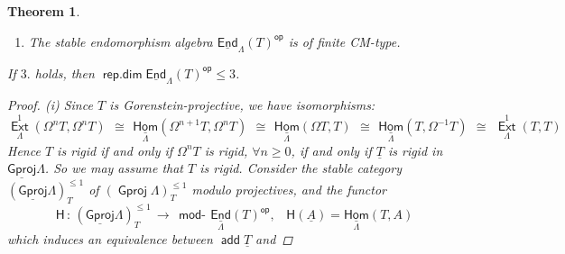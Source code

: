 \documentclass[oneside, a4paper,reqno]{amsart}
\numberwithin{equation}{section}
\newtheorem{thm}{Theorem}[section]
\theoremstyle{definition}
\begin{document}
\begin{thm}
\begin{enumerate}
\begin{enumerate}
\begin{enumerate}
\item[3.] The stable endomorphism algebra $\operatorname*{\underline{\mathsf{End}}}_{\Lambda}(T)^\operatorname*{\mathsf{op}}$ is of finite CM-type.
\end{enumerate}
If $\mathrm{3.}$ holds, then $\operatorname*{\mathsf{rep.dim}}\operatorname*{\underline{\mathsf{End}}}_{\Lambda}(T)^\operatorname*{\mathsf{op}} \leq 3$.
\end{enumerate}
\end{enumerate}
\begin{proof} (i) Since $T$ is Gorenstein-projective, we have
isomorphisms:
\[
\operatorname*{\mathsf{Ext}}^{1}_{\Lambda}(\Omega^{n}T,\Omega^{n}T)\,\  \cong \,\
\operatorname*{\underline{\mathsf{Hom}}}_{\Lambda}(\Omega^{n+1}T,\Omega^{n}T)\,\  \cong \,\
\operatorname*{\underline{\mathsf{Hom}}}_{\Lambda}(\Omega T,T)\,\ \cong \,\
\operatorname*{\underline{\mathsf{Hom}}}_{\Lambda}(T,\Omega^{-1}T) \,\ \cong \,\
\operatorname*{\mathsf{Ext}}^{1}_{\Lambda}(T,T)
\]
Hence $T$ is rigid if and only if $\Omega^{n}T$ is rigid, $\forall n
\geq 0$, if and only if $\underline{T}$ is rigid in
${\operatorname{\underline{\mathsf{Gproj}}}\nolimits}\Lambda$.  So we may assume that $T$ is rigid. Consider the stable category $({\operatorname{\underline{\mathsf{Gproj}}}\nolimits}\Lambda)^{\leq 1}_{T}$ of $({\operatorname{\mathsf{Gproj}}\nolimits}\Lambda)^{\leq 1}_{T}$ modulo projectives, and the functor
\[
\mathsf{H}\,  : \,  ({\operatorname{\underline{\mathsf{Gproj}}}\nolimits}\Lambda)^{\leq 1}_{T} \, {\longrightarrow} \,
\operatorname*{\mathsf{mod}-\!}\operatorname*{\underline{\mathsf{End}}}_{\Lambda}(T)^\operatorname*{\mathsf{op}}, \,\,\,\,\, \mathsf{H}({\underline A}) =
\operatorname*{\underline{\mathsf{Hom}}}_{\Lambda}(T,A)
\]
which induces an equivalence between $\operatorname*{\mathsf{add}} \underline{T}$ and

\end{proof}
\end{thm}
\end{document}
